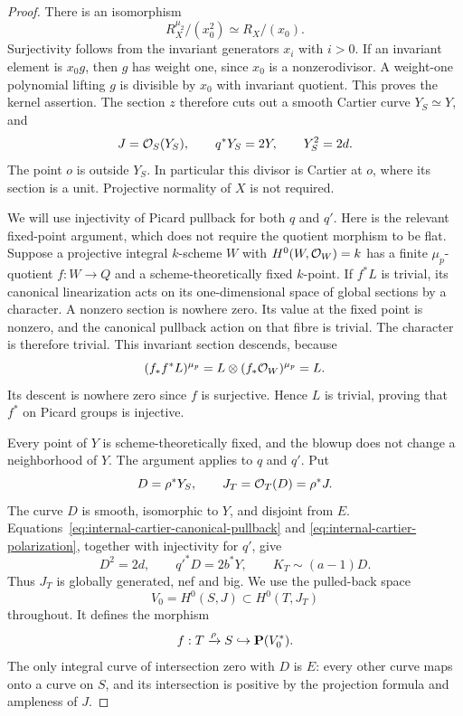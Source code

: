 \begin{proof}
There is an isomorphism
\[
 R_X^{\mu_2}/(x_0^2)\simeq R_X/(x_0).
\]
Surjectivity follows from the invariant generators $x_i$ with
$i>0$. If an invariant element is $x_0g$, then $g$ has weight
one, since $x_0$ is a nonzerodivisor. A weight-one polynomial
lifting $g$ is divisible by $x_0$ with invariant quotient. This
proves the kernel assertion. The section $z$ therefore cuts out
a smooth Cartier curve $Y_S\simeq Y$, and
\begin{equation}\label{eq:internal-cartier-polarization}
 J=\mathcal O_S(Y_S),\qquad q^*Y_S=2Y,\qquad Y_S^2=2d.
\end{equation}
The point $o$ is outside $Y_S$. In particular this divisor is
Cartier at $o$, where its section is a unit. Projective normality
of $X$ is not required.

We will use injectivity of Picard pullback for both $q$ and $q'$.
Here is the relevant fixed-point argument, which does not require
the quotient morphism to be flat. Suppose a projective integral
$k$-scheme $W$ with $H^0(W,\mathcal O_W)=k$ has a finite $\mu_p$-quotient
$f:W\to Q$ and a scheme-theoretically fixed $k$-point. If $f^*L$
is trivial, its canonical linearization acts on its one-dimensional
space of global sections by a character. A nonzero section is
nowhere zero. Its value at the fixed point is nonzero, and the
canonical pullback action on that fibre is trivial. The character
is therefore trivial. This invariant section descends, because
\[
 (f_*f^*L)^{\mu_p}
 =L\otimes(f_*\mathcal O_W)^{\mu_p}=L.
\]
Its descent is nowhere zero since $f$ is surjective. Hence $L$
is trivial, proving that $f^*$ on Picard groups is injective.

Every point of $Y$ is scheme-theoretically fixed, and the blowup
does not change a neighborhood of $Y$. The argument applies to
$q$ and $q'$. Put
\[
 D=\rho^*Y_S,\qquad J_T=\mathcal O_T(D)=\rho^*J.
\]
The curve $D$ is smooth, isomorphic to $Y$, and disjoint from $E$.
Equations~\eqref{eq:internal-cartier-canonical-pullback} and
\eqref{eq:internal-cartier-polarization}, together with injectivity
for $q'$, give
\begin{equation}\label{eq:internal-cartier-canonical-class}
 D^2=2d,\qquad q'^*D=2b^*Y,
 \qquad K_T\sim(a-1)D.
\end{equation}
Thus $J_T$ is globally generated, nef and big. We use the pulled-back
space
\[
 V_0=H^0(S,J)\subset H^0(T,J_T)
\]
throughout. It defines the morphism
\[
 f:T\xrightarrow{\rho}S\hookrightarrow\mathbf P(V_0^*).
\]
The only integral curve of intersection zero with
$D$ is $E$: every other curve maps onto a curve on $S$, and its
intersection is positive by the projection formula and ampleness
of $J$.


\end{proof}
